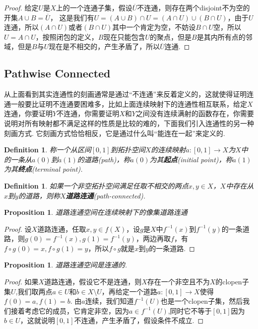 \documentclass{article}
\newtheorem{proposition}[theorem]{Proposition}
\newtheorem{definition}[theorem]{Definition}
\newcommand*{\xfunc}[4]{{#2}\colon{#3}{#1}{#4}}
\newcommand*{\func}[3]{\xfunc{\to}{#1}{#2}{#3}}
\begin{document}
\begin{proof}
给定$U$是$X$上的一个连通子集，假设$\overline{U}$不连通，则存在两个disjoint不为空的开集$A \cup B = \overline{U}$， 这是我们有$U = (A \cup B) \cap U = (A \cap U) \cup (B \cap U)$，由于$U$连通，所以$(A \cap U)$或者$(B \cap U)$其中一个肯定为空，不妨设$B \cap U$空，所以$U = A \cap U$，按照闭包的定义，$B$现在只能包含$U$的聚点，但是$B$是其内所有点的邻域，但是$B$与$U$现在是不相交的，产生矛盾了，所以$\overline{U}$连通.
\end{proof}

\newpage
\subsection{Pathwise Connected}

从上面看到其实连通性的刻画通常是通过“不连通”来反着定义的，这就使得证明连通一般要比证明不连通要困难多，比如上面连续映射下的连通性相互联系，给定$X$连通，你要证明$Y$不连通，你需要证明$X$和$Y$之间没有连续满射的函数存在，你需要说明对所有映射都不满足这样的性质是比较的难的，下面我们引入连通性的另一种刻画方式. 它刻画方式恰恰相反，它是通过什么叫“能连在一起”来定义的.

\begin{definition}
\rm 称一个从区间$[0,1]$到拓扑空间$X$的连续映射$\func{a}{[0,1]}{X}$为$X$中的一条从$a(0)$到$a(1)$的道路(path)，称$a(0)$为其\textbf{起点}(initial point)，称$a(1)$为其\textbf{终点}(terminal point).
\end{definition}

\begin{definition}
\rm 如果一个非空拓扑空间满足任取不相交的两点$x,y \in X$，$X$中存在从$x$到$y$的道路，则称$X$\textbf{道路连通}(path-connected).
\end{definition}

\begin{proposition}
道路连通空间在连续映射下的像集道路连通
\end{proposition}

\begin{proof}
设$X$道路连通，任取$x,y \in f(X)$，设$g$是$X$中$f^{-1}(x)$到$f^{-1}(y)$的一条道路，则$g(0)=f^{-1}(x),g(1)=f^{-1}(y)$，两边再取$f$，有$f \circ g(0) = x,f \circ g(1) = y$，所以$f \circ g$就是$x$到$y$的一条道路.
\end{proof}

\begin{proposition}
道路连通空间是连通的.
\end{proposition}

\begin{proof}
如果$X$道路连通，假设它不是连通，则$X$存在一个非空且不为$X$的clopen子集$U$,我们取两点$a \in U$和$b \in X \setminus U$，再给定一个道路$\func{a}{[0,1]}{X}$使得$f(0)=a,f(1)=b$. 由$a$连续，我们知道$f^{-1}(U)$也是一个clopen子集，然后我们接着考虑它的成员，它肯定非空，因为$a \in f^{-1}(U)$,同时它不等于$[0,1]$因为$b \in U$，这就说明$[0,1]$不连通，产生矛盾了，假设条件不成立.
\end{proof}
\end{document}
